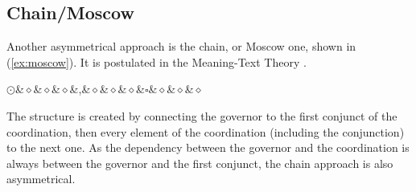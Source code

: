 \subsection{Chain/Moscow}
Another asymmetrical approach is the chain, or Moscow one, shown in (\ref{ex:moscow}). It is postulated in the Meaning-Text Theory \citep{melcuk-1988}. 

\begin{exe}
\ex\label{ex:moscow}
\begin{dependency}[theme = simple, baseline=-\the\dimexpr\fontdimen22\textfont2\relax]
            \begin{deptext}
    $\odot$\&$\diamond$\&$\diamond$\&$\diamond$\&,\&$\diamond$\&$\diamond$\&$\diamond$\&$\square$\&$\diamond$\&$\diamond$\&$\diamond$\\
            \end{deptext}
        \end{dependency}
\end{exe}

The structure is created by connecting the governor to the first conjunct of the coordination, then every element of the coordination (including the conjunction) to the next one. As the dependency between the governor and the coordination is always between the governor and the first conjunct, the chain approach is also asymmetrical. 

